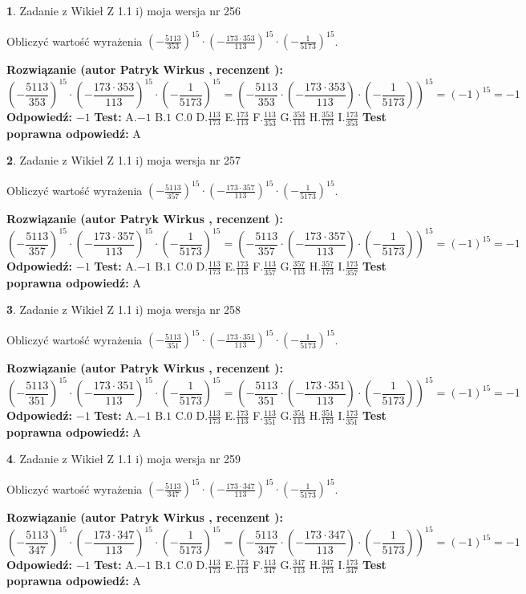 \documentclass[12pt, a4paper]{article}
\theoremstyle{definition} %
\newtheorem{zad}{}
\newcommand{\zadStart}[1]{\begin{zad}#1\newline}
\newcommand{\zadStop}{\end{zad}}
\newcommand{\rozwStart}[2]{\noindent \textbf{Rozwiązanie (autor #1 , recenzent #2): }\newline}
\newcommand{\rozwStop}{\newline}
\newcommand{\odpStart}{\noindent \textbf{Odpowiedź:}\newline}
\newcommand{\odpStop}{\newline}
\newcommand{\testStart}{\noindent \textbf{Test:}\newline}
\newcommand{\testStop}{\newline}
\newcommand{\kluczStart}{\noindent \textbf{Test poprawna odpowiedź:}\newline}
\newcommand{\kluczStop}{\newline}
\begin{document}
\zadStart{Zadanie z Wikieł Z 1.1 i) moja wersja nr 256}

Obliczyć wartość wyrażenia $(-\frac{5113}{353})^{15} \cdot (-\frac{173 \cdot 353}{113})^{15} \cdot (-\frac{1}{5173})^{15}$.
\zadStop
\rozwStart{Patryk Wirkus}{}
$$(-\frac{5113}{353})^{15} \cdot (-\frac{173 \cdot 353}{113})^{15} \cdot (-\frac{1}{5173})^{15} = (-\frac{5113}{353} \cdot (-\frac{173 \cdot 353}{113}) \cdot (-\frac{1}{5173}))^{15} = (-1)^{15} = -1$$
\rozwStop
\odpStart
$-1$
\odpStop
\testStart
A.$-1$ B.$1$ C.$0$ D.$\frac{113}{173}$ E.$\frac{173}{113}$
F.$\frac{113}{353}$ G.$\frac{353}{113}$
H.$\frac{353}{173}$
I.$\frac{173}{353}$
\testStop
\kluczStart
A
\kluczStop



\zadStart{Zadanie z Wikieł Z 1.1 i) moja wersja nr 257}

Obliczyć wartość wyrażenia $(-\frac{5113}{357})^{15} \cdot (-\frac{173 \cdot 357}{113})^{15} \cdot (-\frac{1}{5173})^{15}$.
\zadStop
\rozwStart{Patryk Wirkus}{}
$$(-\frac{5113}{357})^{15} \cdot (-\frac{173 \cdot 357}{113})^{15} \cdot (-\frac{1}{5173})^{15} = (-\frac{5113}{357} \cdot (-\frac{173 \cdot 357}{113}) \cdot (-\frac{1}{5173}))^{15} = (-1)^{15} = -1$$
\rozwStop
\odpStart
$-1$
\odpStop
\testStart
A.$-1$ B.$1$ C.$0$ D.$\frac{113}{173}$ E.$\frac{173}{113}$
F.$\frac{113}{357}$ G.$\frac{357}{113}$
H.$\frac{357}{173}$
I.$\frac{173}{357}$
\testStop
\kluczStart
A
\kluczStop



\zadStart{Zadanie z Wikieł Z 1.1 i) moja wersja nr 258}

Obliczyć wartość wyrażenia $(-\frac{5113}{351})^{15} \cdot (-\frac{173 \cdot 351}{113})^{15} \cdot (-\frac{1}{5173})^{15}$.
\zadStop
\rozwStart{Patryk Wirkus}{}
$$(-\frac{5113}{351})^{15} \cdot (-\frac{173 \cdot 351}{113})^{15} \cdot (-\frac{1}{5173})^{15} = (-\frac{5113}{351} \cdot (-\frac{173 \cdot 351}{113}) \cdot (-\frac{1}{5173}))^{15} = (-1)^{15} = -1$$
\rozwStop
\odpStart
$-1$
\odpStop
\testStart
A.$-1$ B.$1$ C.$0$ D.$\frac{113}{173}$ E.$\frac{173}{113}$
F.$\frac{113}{351}$ G.$\frac{351}{113}$
H.$\frac{351}{173}$
I.$\frac{173}{351}$
\testStop
\kluczStart
A
\kluczStop



\zadStart{Zadanie z Wikieł Z 1.1 i) moja wersja nr 259}

Obliczyć wartość wyrażenia $(-\frac{5113}{347})^{15} \cdot (-\frac{173 \cdot 347}{113})^{15} \cdot (-\frac{1}{5173})^{15}$.
\zadStop
\rozwStart{Patryk Wirkus}{}
$$(-\frac{5113}{347})^{15} \cdot (-\frac{173 \cdot 347}{113})^{15} \cdot (-\frac{1}{5173})^{15} = (-\frac{5113}{347} \cdot (-\frac{173 \cdot 347}{113}) \cdot (-\frac{1}{5173}))^{15} = (-1)^{15} = -1$$
\rozwStop
\odpStart
$-1$
\odpStop
\testStart
A.$-1$ B.$1$ C.$0$ D.$\frac{113}{173}$ E.$\frac{173}{113}$
F.$\frac{113}{347}$ G.$\frac{347}{113}$
H.$\frac{347}{173}$
I.$\frac{173}{347}$
\testStop
\kluczStart
A
\kluczStop
\end{document}
